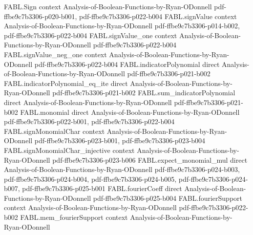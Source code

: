 \begin{theorem}
\label{FABL.fourierWeightAtLevel_majority_complementary}
\leanok
{}
\proofstep
  {FABL.Sign}
  {context}
  {Analysis-of-Boolean-Functions-by-Ryan-ODonnell}
  {pdf-ffbe9c7b3306-p020-b001,
    pdf-ffbe9c7b3306-p022-b004}
\proofstep
  {FABL.signValue}
  {context}
  {Analysis-of-Boolean-Functions-by-Ryan-ODonnell}
  {pdf-ffbe9c7b3306-p014-b002,
    pdf-ffbe9c7b3306-p022-b004}
\proofstep
  {FABL.signValue_one}
  {context}
  {Analysis-of-Boolean-Functions-by-Ryan-ODonnell}
  {pdf-ffbe9c7b3306-p022-b004}
\proofstep
  {FABL.signValue_neg_one}
  {context}
  {Analysis-of-Boolean-Functions-by-Ryan-ODonnell}
  {pdf-ffbe9c7b3306-p022-b004}
\proofstep
  {FABL.indicatorPolynomial}
  {direct}
  {Analysis-of-Boolean-Functions-by-Ryan-ODonnell}
  {pdf-ffbe9c7b3306-p021-b002}
\proofstep
  {FABL.indicatorPolynomial_eq_ite}
  {direct}
  {Analysis-of-Boolean-Functions-by-Ryan-ODonnell}
  {pdf-ffbe9c7b3306-p021-b002}
\proofstep
  {FABL.sum_indicatorPolynomial}
  {direct}
  {Analysis-of-Boolean-Functions-by-Ryan-ODonnell}
  {pdf-ffbe9c7b3306-p021-b002}
\proofstep
  {FABL.monomial}
  {direct}
  {Analysis-of-Boolean-Functions-by-Ryan-ODonnell}
  {pdf-ffbe9c7b3306-p022-b001,
    pdf-ffbe9c7b3306-p022-b004}
\proofstep
  {FABL.signMonomialChar}
  {context}
  {Analysis-of-Boolean-Functions-by-Ryan-ODonnell}
  {pdf-ffbe9c7b3306-p023-b001,
    pdf-ffbe9c7b3306-p023-b004}
\proofstep
  {FABL.signMonomialChar_injective}
  {context}
  {Analysis-of-Boolean-Functions-by-Ryan-ODonnell}
  {pdf-ffbe9c7b3306-p023-b006}
\proofstep
  {FABL.expect_monomial_mul}
  {direct}
  {Analysis-of-Boolean-Functions-by-Ryan-ODonnell}
  {pdf-ffbe9c7b3306-p024-b003,
    pdf-ffbe9c7b3306-p024-b004,
    pdf-ffbe9c7b3306-p024-b005,
    pdf-ffbe9c7b3306-p024-b007,
    pdf-ffbe9c7b3306-p025-b001}
\proofstep
  {FABL.fourierCoeff}
  {direct}
  {Analysis-of-Boolean-Functions-by-Ryan-ODonnell}
  {pdf-ffbe9c7b3306-p025-b004}
\proofstep
  {FABL.fourierSupport}
  {context}
  {Analysis-of-Boolean-Functions-by-Ryan-ODonnell}
  {pdf-ffbe9c7b3306-p022-b002}
\proofstep
  {FABL.mem_fourierSupport}
  {context}
  {Analysis-of-Boolean-Functions-by-Ryan-ODonnell}

\end{theorem}
